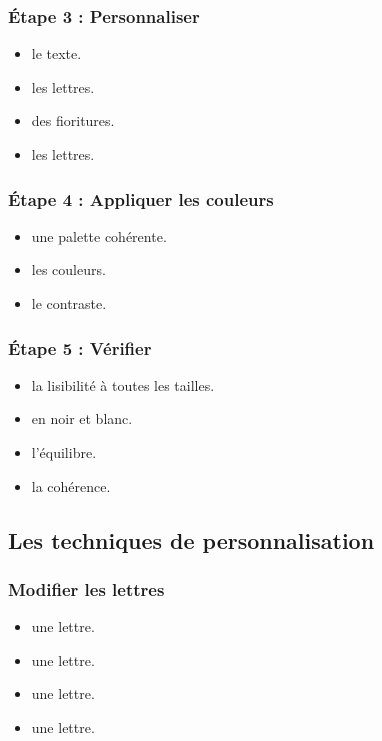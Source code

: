 \subsubsection{Étape 3 : Personnaliser}

\begin{itemize}
    \item {} le texte.
    \item {} les lettres.
    \item {} des fioritures.
    \item {} les lettres.
\end{itemize}

\subsubsection{Étape 4 : Appliquer les couleurs}

\begin{itemize}
    \item {} une palette cohérente.
    \item {} les couleurs.
    \item {} le contraste.
\end{itemize}

\subsubsection{Étape 5 : Vérifier}

\begin{itemize}
    \item {} la lisibilité à toutes les tailles.
    \item {} en noir et blanc.
    \item {} l'équilibre.
    \item {} la cohérence.
\end{itemize}

\subsection{Les techniques de personnalisation}

\subsubsection{Modifier les lettres}

\begin{itemize}
    \item {} une lettre.
    \item {} une lettre.
    \item {} une lettre.
    \item {} une lettre.
\end{itemize}

